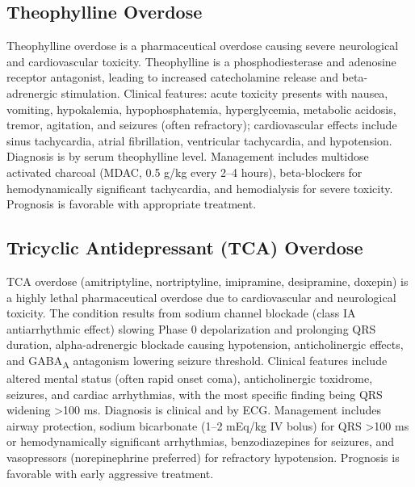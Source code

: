\subsection{Theophylline Overdose}
\label{sec:Theophylline Overdose}
Theophylline overdose is a pharmaceutical overdose causing severe neurological and cardiovascular toxicity. Theophylline is a phosphodiesterase and adenosine receptor antagonist, leading to increased catecholamine release and beta-adrenergic stimulation. Clinical features: acute toxicity presents with nausea, vomiting, hypokalemia, hypophosphatemia, hyperglycemia, metabolic acidosis, tremor, agitation, and seizures (often refractory); cardiovascular effects include sinus tachycardia, atrial fibrillation, ventricular tachycardia, and hypotension. Diagnosis is by serum theophylline level. Management includes multidose activated charcoal (MDAC, 0.5 g/kg every 2--4 hours), beta-blockers for hemodynamically significant tachycardia, and hemodialysis for severe toxicity. Prognosis is favorable with appropriate treatment.

\subsection{Tricyclic Antidepressant (TCA) Overdose}
\label{sec:TCA Overdose}
TCA overdose (amitriptyline, nortriptyline, imipramine, desipramine, doxepin) is a highly lethal pharmaceutical overdose due to cardiovascular and neurological toxicity. The condition results from sodium channel blockade (class IA antiarrhythmic effect) slowing Phase 0 depolarization and prolonging QRS duration, alpha-adrenergic blockade causing hypotension, anticholinergic effects, and GABA\textsubscript{A} antagonism lowering seizure threshold. Clinical features include altered mental status (often rapid onset coma), anticholinergic toxidrome, seizures, and cardiac arrhythmias, with the most specific finding being QRS widening >100 ms. Diagnosis is clinical and by ECG. Management includes airway protection, sodium bicarbonate (1--2 mEq/kg IV bolus) for QRS >100 ms or hemodynamically significant arrhythmias, benzodiazepines for seizures, and vasopressors (norepinephrine preferred) for refractory hypotension. Prognosis is favorable with early aggressive treatment.

